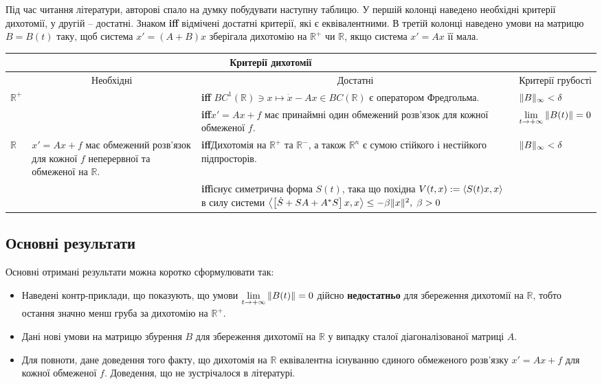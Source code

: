 \documentclass{SHVpaper}
\begin{document}
Під час читання літератури, авторові спало на думку побудувати наступну таблицю. У першій колонці наведено необхідні критерії
дихотомії, у другій -- достатні. Знаком \textbf{iff} відмічені достатні критерії, які є еквівалентними. В третій колонці
наведено умови на матрицю $B=B(t)$ таку, щоб система $x'=(A+B)x$ зберігала дихотомію на $\mathbb{R}^+$ чи $\mathbb{R}$, якщо
система $x'=Ax$ її мала.
\begin{center}
\newcommand{\mygraycenteredcell}[1]{\multicolumn{1}{c|}{\cellcolor{gray}#1}}
\newcommand{\mygraycenteredcello}{\cellcolor{gray}}

\begin{tabular}{ |l| p{} | p{} | p{}| }
	\mygraycenteredcello&\multicolumn{2}{c|}{\cellcolor{gray}Критерії дихотомії}&\mygraycenteredcello\\\hline
&\mygraycenteredcell{Необхідні}&\mygraycenteredcell{Достатні}&\mygraycenteredcell{Критерії грубості}\\\hline\hline

$\mathbb{R}^+$&
&
\textbf{iff} $BC^1(\mathbb{R})\ni x\mapsto \dot{x}-Ax\in BC(\mathbb{R})$ є оператором Фредгольма. \cite{palmer88}&
$\|B\|_\infty<\delta$ \cite{coppel}\\\hline

&
&
\textbf{iff}$x'=Ax+f$ має принаймні один обмежений розв’язок для кожної обмеженої  $f$. \cite{coppel}&
$\lim_{t\to+\infty}\mynorm{B(t)}=0$\cite{coppel}\\\hline\hline
$\mathbb{R}$&
$x'=Ax+f$ має обмежений розв’язок для кожної $f$ неперервної та обмеженої на $\mathbb{R}$.&
\textbf{iff}\qquad Дихотомія на $\mathbb{R}^+$ та $\mathbb{R}^-$, а також $\mathbb{R}^n$ є сумою стійкого і нестійкого підпросторів.
	\cite[Proposition 2.1]{palmer84} &
$\|B\|_\infty<\delta$\cite{coppel}\\\hline
&
&
\textbf{iff}існує симетрична форма $S(t)$, така що похідна $V(t,x):=\left<S(t)x,x\right>$ в силу системи
$\left<\left[\dot{S}+SA+A^*S\right]x,x\right>\leq-\beta\|x\|^2,\;\beta>0$&
\\\hline
\end{tabular}
\end{center}
\subsection{Основні результати}
Основні отримані результати можна коротко сформулювати так:
\begin{itemize}
	\item Наведені контр-приклади, що показують, що умови $\lim_{t\to+\infty}\mynorm{B(t)}=0$ дійсно \textbf{недостатньо} 
		для збереження дихотомії на $\mathbb{R}$, тобто остання значно менш груба за дихотомію на $\mathbb{R}^+$.
	\item Дані нові умови на матрицю збурення $B$ для збереження дихотомії на $\mathbb{R}$ у випадку сталої діагоналізованої
		матриці $A$.
	\item Для повноти, дане доведення того факту, що дихотомія на $\mathbb{R}$ еквівалентна існуванню єдиного обмеженого розв’язку
		$x'=Ax+f$ для кожної обмеженої $f$. Доведення, що не зустрічалося в літературі.
\end{itemize}
\end{document}
